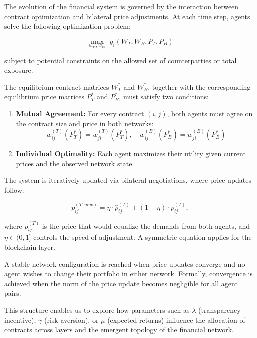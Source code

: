 The evolution of the financial system is governed by the interaction between contract optimization and bilateral price adjustments. At each time step, agents solve the following optimization problem:

\begin{equation}
\max_{w_{Ti}, w_{Bi}}\; g_i(W_T, W_B, P_T, P_B)
\end{equation}

subject to potential constraints on the allowed set of counterparties or total exposure.

The equilibrium contract matrices \( W_T^* \) and \( W_B^* \), together with the corresponding equilibrium price matrices \( P_T^* \) and \( P_B^* \), must satisfy two conditions:

\begin{enumerate}
    \item \textbf{Mutual Agreement:} For every contract \( (i, j) \), both agents must agree on the contract size and price in both networks:
    \begin{equation}
    w_{ij}^{(T)}(P_T^*) = w_{ji}^{(T)}(P_T^*), \quad w_{ij}^{(B)}(P_B^*) = w_{ji}^{(B)}(P_B^*)
    \end{equation}
    
    \item \textbf{Individual Optimality:} Each agent maximizes their utility given current prices and the observed network state.
\end{enumerate}

The system is iteratively updated via bilateral negotiations, where price updates follow:

\begin{equation}
p_{ij}^{(T,new)} = \eta \cdot \hat{p}_{ij}^{(T)} + (1 - \eta) \cdot p_{ij}^{(T)},
\end{equation}

where \( \hat{p}_{ij}^{(T)} \) is the price that would equalize the demands from both agents, and \( \eta \in (0, 1] \) controls the speed of adjustment. A symmetric equation applies for the blockchain layer.

A stable network configuration is reached when price updates converge and no agent wishes to change their portfolio in either network. Formally, convergence is achieved when the norm of the price update becomes negligible for all agent pairs.

This structure enables us to explore how parameters such as \( \lambda \) (transparency incentive), \( \gamma \) (risk aversion), or \( \mu \) (expected returns) influence the allocation of contracts across layers and the emergent topology of the financial network.

